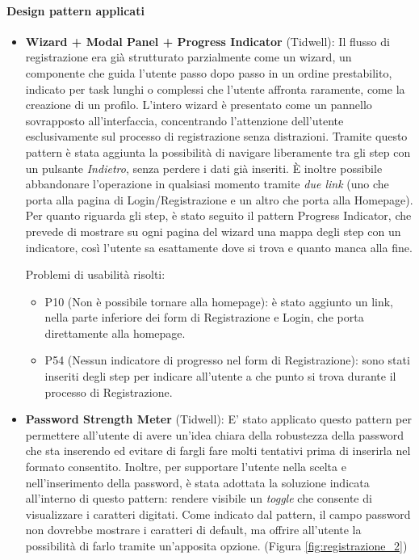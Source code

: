 \paragraph{Design pattern applicati}
\begin{itemize}
  \item \textbf{Wizard + Modal Panel + Progress Indicator} (Tidwell): Il flusso di registrazione era già strutturato parzialmente come un wizard, un componente che guida l'utente passo dopo passo in un ordine prestabilito, indicato per task lunghi o complessi che l'utente affronta raramente, come la creazione di un profilo. L'intero wizard è presentato come un pannello sovrapposto all'interfaccia, concentrando l'attenzione dell'utente esclusivamente sul processo di registrazione senza distrazioni. Tramite questo pattern è stata aggiunta la possibilità di navigare liberamente tra gli step con un pulsante \textit{Indietro}, senza perdere i dati già inseriti. È inoltre possibile abbandonare l'operazione in qualsiasi momento tramite \textit{due link} (uno che porta alla pagina di Login/Registrazione e un altro che porta alla Homepage). Per quanto riguarda gli step, è stato seguito il pattern Progress Indicator, che prevede di mostrare su ogni pagina del wizard una mappa degli step con un indicatore, così l'utente sa esattamente dove si trova e quanto manca alla fine.

    Problemi di usabilità risolti:
    \begin{itemize}
      \item P10 (Non è possibile tornare alla homepage): è stato aggiunto un link, nella parte inferiore dei form di Registrazione e Login, che porta direttamente alla homepage.
      \item P54 (Nessun indicatore di progresso nel form di Registrazione): sono stati inseriti degli step per indicare all'utente a che punto si trova durante il processo di Registrazione.
    \end{itemize}

  \item \textbf{Password Strength Meter} (Tidwell): E' stato applicato questo pattern per permettere all'utente di avere un'idea chiara della robustezza della password che sta inserendo ed evitare di fargli fare molti tentativi prima di inserirla nel formato consentito. Inoltre, per supportare l'utente nella scelta e nell'inserimento della password, è stata adottata la soluzione indicata all'interno di questo pattern: rendere visibile un \textit{toggle} che consente di visualizzare i caratteri digitati. Come indicato dal pattern, il campo password non dovrebbe mostrare i caratteri di default, ma offrire all'utente la possibilità di farlo tramite un'apposita opzione. (Figura \ref{fig:registrazione_2})


\end{itemize}
